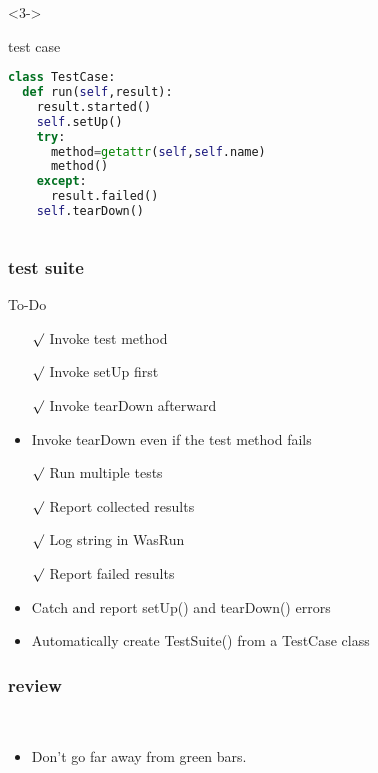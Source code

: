 \documentclass[lualatex]{beamer}
\begin{document}
\begin{frame}[fragile,t]
\begin{columns}[t]
        \begin{onlyenv}<3->
            \begin{block}{test case}
                \begin{lstlisting}[language=Python,columns=fullflexible]
class TestCase:
  def run(self,result):
    result.started()
    self.setUp()
    try:
      method=getattr(self,self.name)
      method()
    except:
      result.failed()
    self.tearDown()
                \end{lstlisting}
            \end{block}
        \end{onlyenv}
    \end{columns}
\end{frame}

\begin{frame}
    \frametitle{test suite}

    \begin{block}{To-Do}
        \begin{itemize}
            \item[$\surd$] Invoke test method
            \item[$\surd$] Invoke setUp first 
            \item[$\surd$] Invoke tearDown afterward 
            \item Invoke tearDown even if the test method fails 
            \item[$\surd$] Run multiple tests 
            \item[$\surd$] Report collected results 
            \item[$\surd$] Log string in WasRun 
            \item[$\surd$] Report failed results
            \item Catch and report setUp() and tearDown() errors
            \item Automatically create TestSuite() from a TestCase class
        \end{itemize}
    \end{block}
\end{frame}

\begin{frame}
    \frametitle{review}

    \begin{block}{~}
        \begin{itemize}
            \item 
                Don't go far away from green bars.
        \end{itemize}
    \end{block}
\end{frame}
\end{document}
